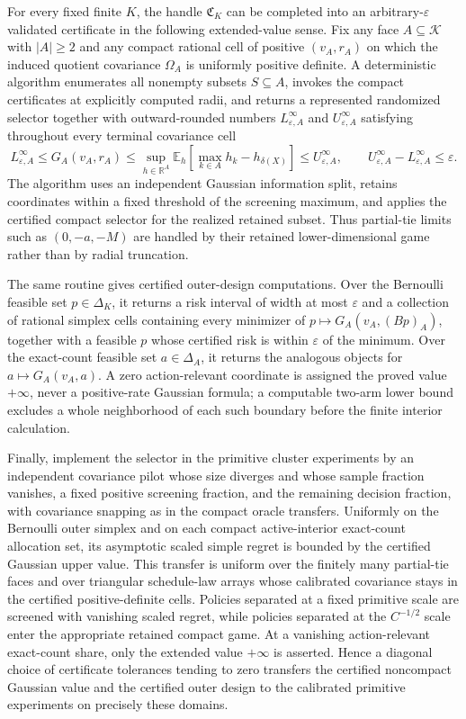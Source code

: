 For every fixed finite \(K\), the handle \(\mathfrak C_K\) can be completed into an arbitrary-\(\varepsilon\) validated certificate in the following extended-value sense.  Fix any face \(A\subseteq\mathcal K\) with \(|A|\geq2\) and any compact rational cell of positive \((v_A,r_A)\) on which the induced quotient covariance \(\Omega_A\) is uniformly positive definite.  A deterministic algorithm enumerates all nonempty subsets \(S\subseteq A\), invokes the compact certificates at explicitly computed radii, and returns a represented randomized selector together with outward-rounded numbers \(L^{\infty}_{\varepsilon,A}\) and \(U^{\infty}_{\varepsilon,A}\) satisfying throughout every terminal covariance cell
\[
L^{\infty}_{\varepsilon,A}
\leq G_A(v_A,r_A)
\leq \sup_{h\in\mathbb R^A}
\mathbb E_h\!\left[\max_{k\in A}h_k-h_{\delta(X)}\right]
\leq U^{\infty}_{\varepsilon,A},
\qquad
U^{\infty}_{\varepsilon,A}-L^{\infty}_{\varepsilon,A}\leq\varepsilon.
\]
The algorithm uses an independent Gaussian information split, retains coordinates within a fixed threshold of the screening maximum, and applies the certified compact selector for the realized retained subset.  Thus partial-tie limits such as \((0,-a,-M)\) are handled by their retained lower-dimensional game rather than by radial truncation.

The same routine gives certified outer-design computations.  Over the Bernoulli feasible set \(p\in\Delta_K\), it returns a risk interval of width at most \(\varepsilon\) and a collection of rational simplex cells containing every minimizer of \(p\mapsto G_A(v_A,(Bp)_A)\), together with a feasible \(p\) whose certified risk is within \(\varepsilon\) of the minimum.  Over the exact-count feasible set \(a\in\Delta_A\), it returns the analogous objects for \(a\mapsto G_A(v_A,a)\).  A zero action-relevant coordinate is assigned the proved value \(+\infty\), never a positive-rate Gaussian formula; a computable two-arm lower bound excludes a whole neighborhood of each such boundary before the finite interior calculation.

Finally, implement the selector in the primitive cluster experiments by an independent covariance pilot whose size diverges and whose sample fraction vanishes, a fixed positive screening fraction, and the remaining decision fraction, with covariance snapping as in the compact oracle transfers.  Uniformly on the Bernoulli outer simplex and on each compact active-interior exact-count allocation set, its asymptotic scaled simple regret is bounded by the certified Gaussian upper value.  This transfer is uniform over the finitely many partial-tie faces and over triangular schedule-law arrays whose calibrated covariance stays in the certified positive-definite cells.  Policies separated at a fixed primitive scale are screened with vanishing scaled regret, while policies separated at the \(C^{-1/2}\) scale enter the appropriate retained compact game.  At a vanishing action-relevant exact-count share, only the extended value \(+\infty\) is asserted.  Hence a diagonal choice of certificate tolerances tending to zero transfers the certified noncompact Gaussian value and the certified outer design to the calibrated primitive experiments on precisely these domains.